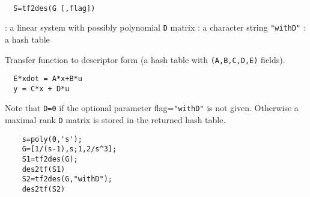 \begin{mandesc}
   \\ %
\end{mandesc}
\begin{calling_sequence}
\begin{verbatim}
  S=tf2des(G [,flag])  
\end{verbatim}
\end{calling_sequence}
\begin{parameters}
  \begin{varlist}
    : a linear system with possibly polynomial \verb!D! matrix
    : a character string \verb!"withD"!
    : a hash table 
  \end{varlist}
\end{parameters}
\begin{mandescription}
  Transfer function to descriptor form (a hash table with \verb!(A,B,C,D,E)! fields).
\begin{verbatim}
  E*xdot = A*x+B*u
  y = C*x + D*u
\end{verbatim}
Note that \verb!D=0! if the optional parameter flag=\verb!"withD"! is not
given. Otherwise a maximal rank \verb!D! matrix is stored in the returned hash table.
\end{mandescription}
\begin{examples}
  \begin{Verbatim}
    s=poly(0,'s');
    G=[1/(s-1),s;1,2/s^3];
    S1=tf2des(G);
    des2tf(S1)
    S2=tf2des(G,"withD");
    des2tf(S2)
  \end{Verbatim}
\end{examples}
\begin{manseealso}
       
\end{manseealso}
